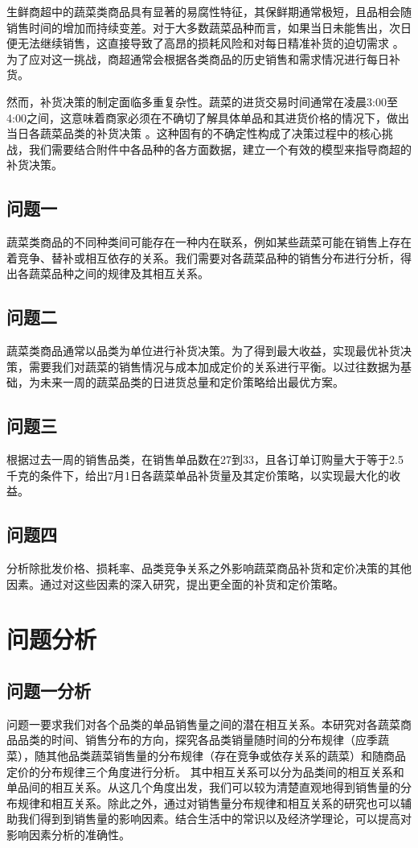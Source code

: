 \documentclass{article}
\begin{document}
生鲜商超中的蔬菜类商品具有显著的易腐性特征，其保鲜期通常极短，且品相会随销售时间的增加而持续变差。对于大多数蔬菜品种而言，如果当日未能售出，次日便无法继续销售，这直接导致了高昂的损耗风险和对每日精准补货的迫切需求 。为了应对这一挑战，商超通常会根据各类商品的历史销售和需求情况进行每日补货。   

然而，补货决策的制定面临多重复杂性。蔬菜的进货交易时间通常在凌晨3:00至4:00之间，这意味着商家必须在不确切了解具体单品和其进货价格的情况下，做出当日各蔬菜品类的补货决策 。这种固有的不确定性构成了决策过程中的核心挑战，我们需要结合附件中各品种的各方面数据，建立一个有效的模型来指导商超的补货决策。



\subsection{问题一}

蔬菜类商品的不同种类间可能存在一种内在联系，例如某些蔬菜可能在销售上存在着竞争、替补或相互依存的关系。我们需要对各蔬菜品种的销售分布进行分析，得出各蔬菜品种之间的规律及其相互关系。

\subsection{问题二}

蔬菜类商品通常以品类为单位进行补货决策。为了得到最大收益，实现最优补货决策，需要我们对蔬菜的销售情况与成本加成定价的关系进行平衡。以过往数据为基础，为未来一周的蔬菜品类的日进货总量和定价策略给出最优方案。
\subsection{问题三}

根据过去一周的销售品类，在销售单品数在27到33，且各订单订购量大于等于2.5千克的条件下，给出7月1日各蔬菜单品补货量及其定价策略，以实现最大化的收益。
\subsection{问题四}

分析除批发价格、损耗率、品类竞争关系之外影响蔬菜商品补货和定价决策的其他因素。通过对这些因素的深入研究，提出更全面的补货和定价策略。
\section{问题分析}

\subsection{问题一分析}
问题一要求我们对各个品类的单品销售量之间的潜在相互关系。本研究对各蔬菜商品品类的时间、销售分布的方向，探究各品类销量随时间的分布规律（应季蔬菜），随其他品类蔬菜销售量的分布规律（存在竞争或依存关系的蔬菜）和随商品定价的分布规律三个角度进行分析。
其中相互关系可以分为品类间的相互关系和单品间的相互关系。从这几个角度出发，我们可以较为清楚直观地得到销售量的分布规律和相互关系。除此之外，通过对销售量分布规律和相互关系的研究也可以辅助我们得到到销售量的影响因素。结合生活中的常识以及经济学理论，可以提高对影响因素分析的准确性。
\end{document}
